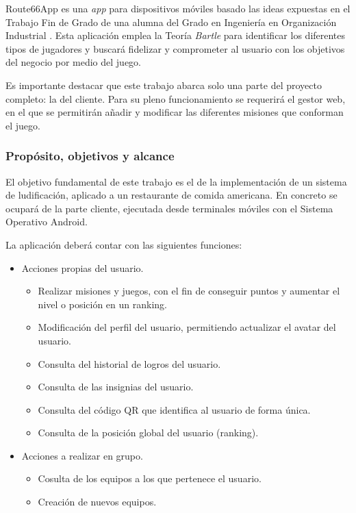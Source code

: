 \documentclass[twoside]{report}
\begin{document}
Route66App es una \textit{app} para dispositivos móviles basado las ideas expuestas en el Trabajo Fin de Grado de una alumna del Grado en Ingeniería en Organización Industrial \cite{cristinatfg}. Esta aplicación emplea la Teoría \textit{Bartle}\cite{iebsctj} para identificar los diferentes tipos de jugadores y buscará fidelizar y comprometer al usuario con los objetivos del negocio por medio del juego.

Es importante destacar que este trabajo abarca solo una parte del proyecto completo: la del cliente. Para su pleno funcionamiento se requerirá el gestor web, en el que se permitirán añadir y modificar las diferentes misiones que conforman el juego. 
 
\subsubsection{Propósito, objetivos y alcance}

El objetivo fundamental de  este trabajo es el de la implementación de un sistema de ludificación, aplicado a un restaurante de comida americana. En concreto se ocupará de la parte cliente, ejecutada desde terminales móviles con el Sistema Operativo Android.

La aplicación deberá contar con las siguientes funciones:
\begin{itemize}
\item Acciones propias del usuario.
	\begin{itemize}
	\item Realizar misiones y juegos, con el fin de conseguir puntos y aumentar el nivel o posición en un ranking.
	\item Modificación del perfil del usuario, permitiendo actualizar el avatar del usuario.
	\item Consulta del historial de logros del usuario.
	\item Consulta de las insignias del usuario.
	\item Consulta del código QR que identifica al usuario de forma única.
	\item Consulta de la posición global del usuario (ranking).
	\end{itemize}
\item Acciones a realizar en grupo.
	\begin{itemize}
	\item Cosulta de los equipos a los que pertenece el usuario.
	\item Creación de nuevos equipos.
	\end{itemize}
\end{itemize}
\end{document}
